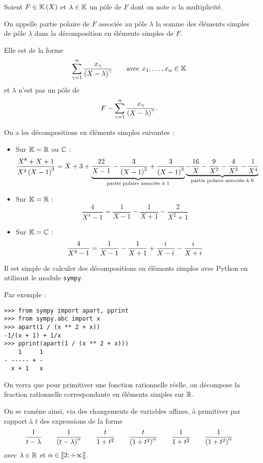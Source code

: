 \begin{defi}
Soient \(F\in\fracrat\) et \(\lambda\in\mathbb{K}\) un pôle de \(F\) dont on note \(\alpha\) la multiplicité.

On appelle partie polaire de \(F\) associée au pôle \(\lambda\) la somme des éléments simples de pôle \(\lambda\) dans la décomposition en éléments simples de \(F\).

Elle est de la forme \[\sum_{\gamma=1}^{\alpha}\dfrac{x_\gamma}{\left(X-\lambda\right)^\gamma}\qquad\text{avec }x_1,\dots,x_\alpha\in\mathbb{K}\] et \(\lambda\) n'est pas un pôle de \[F-\sum_{\gamma=1}^{\alpha}\dfrac{x_\gamma}{\left(X-\lambda\right)^\gamma}.\]
\end{defi}

\begin{ex}
On a les décompositions en éléments simples suivantes :

\begin{itemize}
\item Sur \(\mathbb{K}=\mathbb{R}\) ou \(\mathbb{C}\) : \[\dfrac{X^8+X+1}{X^4\left(X-1\right)^3}=X+3+\underbrace{\dfrac{22}{X-1}-\dfrac{3}{\left(X-1\right)^2}+\dfrac{3}{\left(X-1\right)^3}}_{\text{partie polaire associée à }1}\underbrace{-\dfrac{16}{X}-\dfrac{9}{X^2}-\dfrac{4}{X^3}-\dfrac{1}{X^4}}_{\text{partie polaire associée à }0}\]

\item Sur \(\mathbb{K}=\mathbb{R}\) : \[\dfrac{4}{X^4-1}=\dfrac{1}{X-1}-\dfrac{1}{X+1}-\dfrac{2}{X^2+1}\]

\item Sur \(\mathbb{K}=\mathbb{C}\) : \[\dfrac{4}{X^4-1}=\dfrac{1}{X-1}-\dfrac{1}{X+1}+\dfrac{i\mkern1mu}{X-i\mkern1mu}-\dfrac{i\mkern1mu}{X+i\mkern1mu}\]
\end{itemize}
\end{ex}

\begin{rem}
Il est simple de calculer des décompositions en éléments simples avec Python en utilisant le module \verb|sympy|.

Par exemple :

\begin{verbatim}
>>> from sympy import apart, pprint
>>> from sympy.abc import x
>>> apart(1 / (x ** 2 + x))
-1/(x + 1) + 1/x
>>> pprint(apart(1 / (x ** 2 + x)))
    1     1
- ----- + -
  x + 1   x
\end{verbatim}
\end{rem}

\begin{rem}
On verra que pour primitiver une fonction rationnelle réelle, on décompose la fraction rationnelle correspondante en éléments simples sur \(\mathbb{R}\).

On se ramène ainsi, via des changements de variables affines, à primitiver par rapport à \(t\) des expressions de la forme \[\dfrac{1}{t-\lambda}\qquad\dfrac{1}{\left(t-\lambda\right)^{\alpha}}\qquad\dfrac{t}{1+t^2}\qquad\dfrac{t}{\left(1+t^2\right)^{\alpha}}\qquad\dfrac{1}{1+t^2}\qquad\dfrac{1}{\left(1+t^2\right)^{\alpha}}\] avec \(\lambda\in\mathbb{R}\) et \(\alpha\in\left\llbracket2;+\infty\right\llbracket\).
\end{rem}

